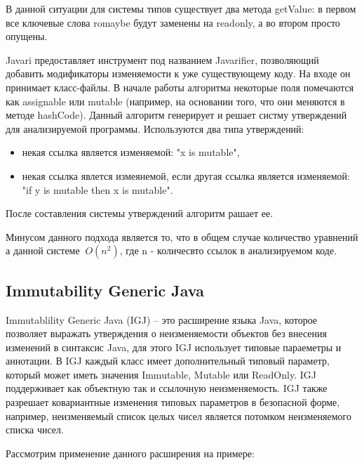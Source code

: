 В данной ситуации для системы типов существует два метода getValue: в первом все ключевые слова romaybe будут заменены на readonly, а во втором просто опущены. 

Javari предоставляет инструмент под названием Javarifier, позволяющий добавить модификаторы изменяемости к уже существующему коду. На входе он принимает класс-файлы. В начале работы алгоритма некоторые поля помечаются как assignable или mutable (например, на основании того, что они меняются в методе hashCode). Данный алгоритм генерирует и решает систму утверждений для анализируемой программы. Используются два типа утверждений:
\begin{itemize}
	
	\item некая ссылка является изменяемой: "x is mutable",
	
	\item некая ссылка явлется измеянемой, если другая ссылка является изменяемой: "if y is mutable then x is mutable".
	
\end{itemize}
После составления системы утверждений алгоритм рашает ее.

Минусом данного подхода является то, что в общем случае количество уравнений а данной системе $~O(n^2)$, где n - количесвто ссылок в анализируемом коде. 

\subsection{Immutability Generic Java}

Immutablility Generic Java (IGJ) \cite{Zibin2007} -- это расширение языка Java, которое позволяет выражать утверждения о неизменяемости объектов без внесения изменений в синтаксис Java, для этого IGJ использует типовые параеметры и аннотации. В IGJ каждый класс имеет дополнительный типовый параметр, который может иметь значения Immutable, Mutable или ReadOnly. IGJ поддерживает как объектную так и ссылочную неизменяемость. IGJ также разрешает ковариантные изменения типовых параметров в безопасной форме, например, неизменяемый список целых чисел является потомком неизменяемого списка чисел.

Рассмотрим применение данного расширения на примере:

